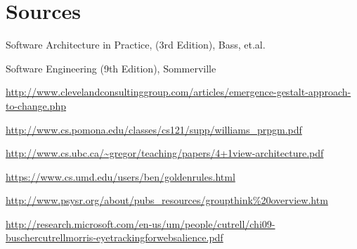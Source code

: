 \chapter*{Sources}

\small
Software Architecture in Practice, (3rd Edition), Bass, et.al.\

Software Engineering (9th Edition), Sommerville

\url{http://www.clevelandconsultinggroup.com/articles/emergence-gestalt-approach-to-change.php}

\url{http://www.cs.pomona.edu/classes/cs121/supp/williams_prpgm.pdf}

\url{http://www.cs.ubc.ca/~gregor/teaching/papers/4+1view-architecture.pdf}

\url{https://www.cs.umd.edu/users/ben/goldenrules.html}

\url{http://www.psysr.org/about/pubs_resources/groupthink\%20overview.htm}

\url{http://research.microsoft.com/en-us/um/people/cutrell/chi09-buschercutrellmorris-eyetrackingforwebsalience.pdf}
\normalsize
